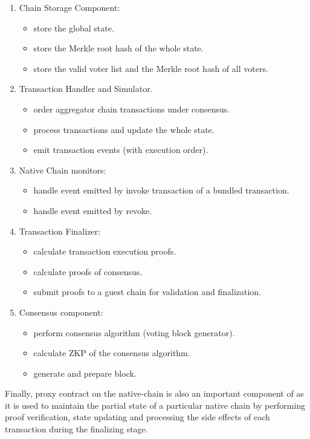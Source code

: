 \begin{enumerate}[leftmargin=*]
\item Chain Storage Component:
    \begin{itemize}
    \item store the global state.
    \item store the Merkle root hash of the whole state.
    \item store the valid voter list and the Merkle root hash of all voters.
    \end{itemize}
\item Transaction Handler and Simulator.
    \begin{itemize}
    \item order aggregator chain transactions under consensus.
    \item process transactions and update the whole state.
    \item emit transaction events (with execution order).
    \end{itemize}
\item Native Chain monitors:
    \begin{itemize}
    \item handle event emitted by invoke transaction of a bundled transaction.
    \item handle event emitted by revoke.
    \end{itemize}
\item Transaction Finalizer:
    \begin{itemize}
    \item calculate transaction execution proofs.
    \item calculate proofs of consensus.
    \item submit proofs to a guest chain for validation and finalization.
    \end{itemize}
\item Consensus component:
    \begin{itemize}
    \item perform consensus algorithm (voting block generator).
    \item calculate ZKP of the consensus algorithm.
    \item generate and prepare block.
    \end{itemize}
\end{enumerate}

Finally, proxy contract on the native-chain is also an important component of \dprotocol as it is used to maintain the partial state of a particular native chain by performing proof verification, state updating and processing the side effects of each transaction during the finalizing stage.  

